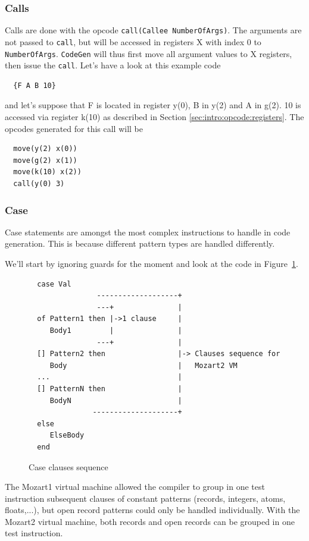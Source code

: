 \documentclass[a4paper]{memoir}
\begin{document}
\subsubsection{Calls}\label{sec:codegen:calls}
Calls are done with the opcode \lstinline!call(Callee NumberOfArgs)!. The arguments are not passed to \lstinline!call!, but will be accessed in registers X with index 0 to \lstinline!NumberOfArgs!. \lstinline!CodeGen! will thus first move all argument values to X registers, then issue the \lstinline!call!.
Let's have a look at this example code
\begin{lstlisting}
  {F A B 10}
\end{lstlisting}
and let's suppose that F is located in register y(0), B in y(2)  and A in g(2). 10 is accessed via register k(10) as described in Section \ref{sec:intro:opcode:registers}.
The opcodes generated for this call will be 
\begin{lstlisting}
  move(y(2) x(0))
  move(g(2) x(1))
  move(k(10) x(2))
  call(y(0) 3)
\end{lstlisting}

\subsubsection{Case}\label{sec:arch:codegen:case}
Case statements are amongst the most complex instructions to handle in code generation. This is because different pattern types are handled differently. 


We'll start by ignoring guards for the moment and look at the code in Figure~\ref{fig:clauses}.

\begin{figure}[ht]
\begin{verbatim}
  case Val
                -------------------+
                ---+               |
  of Pattern1 then |->1 clause     |
     Body1         |               |
                ---+               |
  [] Pattern2 then                 |-> Clauses sequence for 
     Body                          |   Mozart2 VM
  ...                              |
  [] PatternN then                 |
     BodyN                         |
               --------------------+
  else
     ElseBody
  end

\end{verbatim}
\caption{Case clauses sequence}
\label{fig:clauses}
\end{figure}


The Mozart1 virtual machine allowed the compiler to group in one test instruction subsequent clauses of
constant patterns (records, integers, atoms, floats,...), but open
record patterns could only be handled individually.
With the Mozart2 virtual machine, both records and open records can be grouped in one test instruction.
\end{document}
